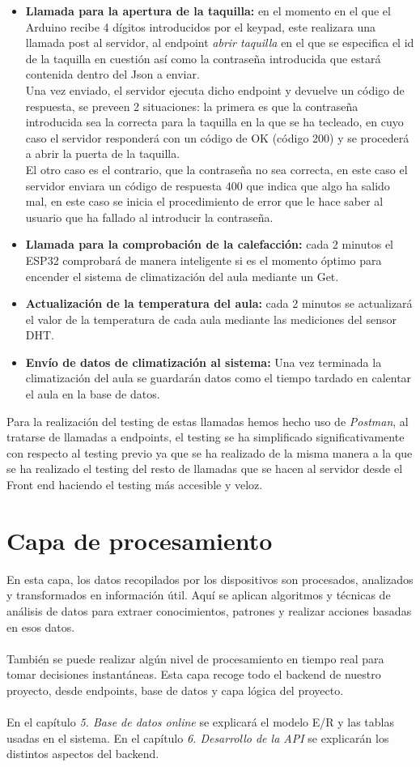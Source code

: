 \documentclass[12pt]{report}
\begin{document}
\begin{itemize}
    \item \textbf{Llamada para la apertura de la taquilla:} en el momento en el que el Arduino recibe 4 dígitos introducidos por el keypad, este realizara una llamada post al servidor, al endpoint \textit{abrir taquilla} en el que se especifica el id de la taquilla en cuestión así como la contraseña introducida que estará contenida dentro del Json a enviar. 
    \\ Una vez enviado, el servidor ejecuta dicho endpoint y devuelve un código de respuesta, se preveen 2 situaciones: la primera es que la contraseña introducida sea la correcta para la taquilla en la que se ha tecleado, en cuyo caso el servidor responderá con un código de OK (código 200) y se procederá a abrir la puerta de la taquilla. 
    \\ El otro caso es el contrario, que la contraseña no sea correcta, en este caso el servidor enviara un código de respuesta 400 que indica que algo ha salido mal, en este caso se inicia el procedimiento de error que le hace saber al usuario que ha fallado al introducir la contraseña.
    \item \textbf{Llamada para la comprobación de la calefacción:} cada 2 minutos el ESP32 comprobará de manera inteligente si es el momento óptimo para encender el sistema de climatización del aula mediante un Get.
    \item  \textbf{Actualización de la temperatura del aula: }cada 2 minutos se actualizará el valor de la temperatura de cada aula mediante las mediciones del sensor DHT.
    \item \textbf{Envío de datos de climatización al sistema: }Una vez terminada la climatización del aula se guardarán datos como el tiempo tardado en calentar el aula en la base de datos.
\end{itemize}
Para la realización del testing de estas llamadas hemos hecho uso de \textit{Postman}, al tratarse de llamadas a endpoints, el testing se ha simplificado significativamente con respecto al testing previo ya que se ha realizado de la misma manera a la que se ha realizado el testing del resto de llamadas que se hacen al servidor desde el Front end haciendo el testing más accesible y veloz.
\section{Capa de procesamiento} 
En esta capa, los datos recopilados por los dispositivos son procesados, analizados y transformados en información útil. Aquí se aplican algoritmos y técnicas de análisis de datos para extraer conocimientos, patrones y realizar acciones basadas en esos datos. 
\\\\
También se puede realizar algún nivel de procesamiento en tiempo real para tomar decisiones instantáneas.
Esta capa recoge todo el backend de nuestro proyecto, desde endpoints, base de datos y capa lógica del proyecto.
\\\\
En el capítulo \textit{5. Base de datos online} se explicará el modelo E/R y las tablas usadas en el sistema. En el capítulo \textit{6. Desarrollo de la API} se explicarán los distintos aspectos del backend.
\end{document}
